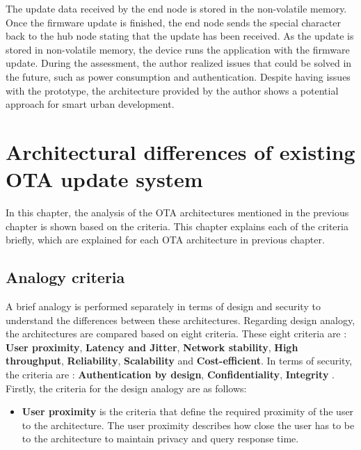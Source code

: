 \documentclass[12pt,a4paper]{article}
\begin{document}
{The update data received by the end node is stored in the non-volatile memory. Once the firmware update is finished, the end node sends the special character back to the hub node stating that the update has been received. As the update is stored in non-volatile memory, the device runs the application with the firmware update. During the assessment, the author realized issues that could be solved in the future, such as power consumption and authentication. Despite having issues with the prototype, the architecture provided by the author shows a potential approach for smart urban development. \cite{r30}


\newpage

\renewcommand{\baselinestretch}{1.5} %
\section{Architectural differences of existing OTA update system}

In this chapter, the analysis of the OTA architectures mentioned in the previous chapter is shown based on the criteria. This chapter explains each of the criteria briefly, which are explained for each OTA architecture in previous chapter.

\subsection{Analogy criteria}

A brief analogy is performed separately in terms of design and security to understand the differences between these architectures. Regarding design analogy, the architectures are compared based on eight criteria. These eight criteria are : \textbf{User proximity}, \textbf{Latency and Jitter}, \textbf{Network stability}, \textbf{High throughput}, \textbf{Reliability}, \textbf{Scalability} and \textbf{Cost-efficient}. In terms of security, the criteria are : \textbf{Authentication by design},  \textbf{Confidentiality}, \textbf{Integrity} \cite{r2}. \\

Firstly, the criteria for the design analogy are as follows:

\begin{itemize}

\item \textbf{User proximity} is the criteria that define the required proximity of the user to the architecture. The user proximity describes how close the user has to be to the architecture to maintain privacy and query response time. \cite{r2}


\end{itemize}}
\end{document}
